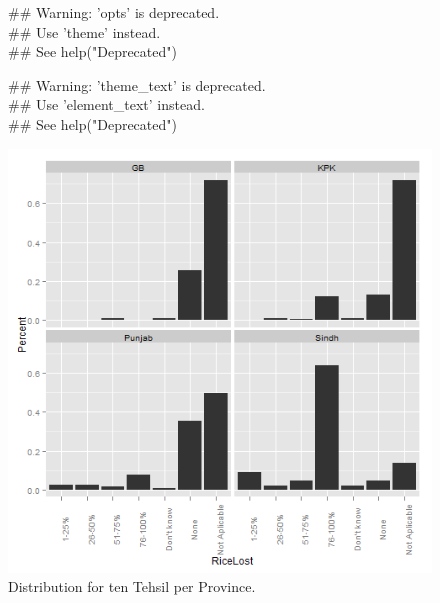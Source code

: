 \begin{figure}[!hbt]
\begin{knitrout}
\color{fgcolor}\begin{kframe}


{\ttfamily\noindent\textcolor{warningcolor}{\#\# Warning: 'opts' is deprecated.\\\#\# Use 'theme' instead.\\\#\# See help("Deprecated")}}

{\ttfamily\noindent\textcolor{warningcolor}{\#\# Warning: 'theme\_text' is deprecated.\\\#\# Use 'element\_text' instead.\\\#\# See help("Deprecated")}}\end{kframe}\includegraphics[width=.9\linewidth]{smallerDist/figures/tenDist} 
\end{knitrout}

\caption{Distribution for ten Tehsil per Province.\label{fig:tenDist}}
\end{figure}


